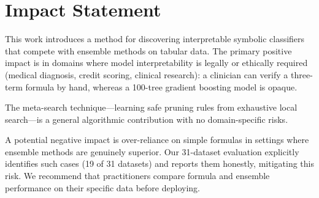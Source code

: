 \documentclass[journal]{IEEEtran}
\begin{document}
\section*{Impact Statement}

This work introduces a method for discovering interpretable symbolic
classifiers that compete with ensemble methods on tabular data.  The
primary positive impact is in domains where model interpretability is
legally or ethically required (medical diagnosis, credit scoring,
clinical research): a clinician can verify a three-term formula by
hand, whereas a 100-tree gradient boosting model is opaque.

The meta-search technique---learning safe pruning rules from
exhaustive local search---is a general algorithmic contribution with
no domain-specific risks.

A potential negative impact is over-reliance on simple formulas in
settings where ensemble methods are genuinely superior.  Our
31-dataset evaluation explicitly identifies such cases (19 of 31
datasets) and reports them honestly, mitigating this risk.  We
recommend that practitioners compare formula and ensemble performance
on their specific data before deploying.
\end{document}
